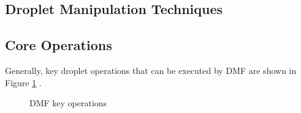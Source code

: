 \subsection{Droplet Manipulation Techniques}

\subsection{Core Operations}
Generally, key droplet operations that can be executed by DMF are shown in Figure \ref{DMFOps} \cite{bhattacharjeeMultipleDilutionSample2012,bhattacharjeeEfficientGenerationDilution2019,bhattacharyaAlgorithmicChallengesDigital2014}.
\begin{figure}[h!]
    \centering
    \caption{DMF key operations}
    \label{DMFOps}
\end{figure}
